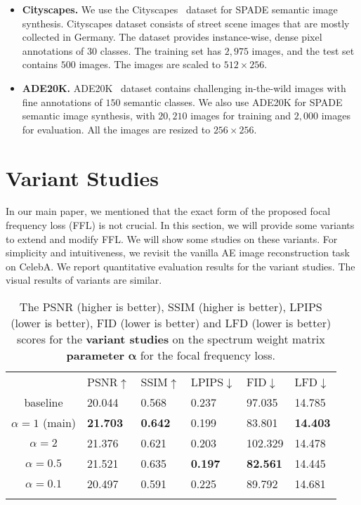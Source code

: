 \documentclass[10pt,twocolumn,letterpaper]{article}
\begin{document}
\begin{itemize}
	\item \textbf{Cityscapes.} We use the Cityscapes~\cite{cityscapes} dataset for SPADE semantic image synthesis. Cityscapes dataset consists of street scene images that are mostly collected in Germany. The dataset provides instance-wise, dense pixel annotations of $30$ classes. The training set has $2,975$ images, and the test set contains $500$ images. The images are scaled to $512 \times 256$.

	\item \textbf{ADE20K.} ADE20K~\cite{ade20k} dataset contains challenging in-the-wild images with fine annotations of $150$ semantic classes. We also use ADE20K for SPADE semantic image synthesis, with $20,210$ images for training and $2,000$ images for evaluation. All the images are resized to $256 \times 256$.
\end{itemize}



\section{Variant Studies}
\label{sec:variants}

In our main paper, we mentioned that the exact form of the proposed focal frequency loss (FFL) is not crucial. In this section, we will provide some variants to extend and modify FFL. We will show some studies on these variants.
For simplicity and intuitiveness, we revisit the vanilla AE image reconstruction task on CelebA.
We report quantitative evaluation results for the variant studies. The visual results of variants are similar.


\begin{table}[tb!]
\centering
\footnotesize
\caption{The PSNR (higher is better), SSIM (higher is better), LPIPS (lower is better), FID (lower is better) and LFD (lower is better) scores for the \textbf{variant studies} on the spectrum weight matrix \textbf{parameter} $\bm\alpha$ for the focal frequency loss.}
\begin{tabularx}{\linewidth}{c|*{5}{|Y}}
\Xhline{1pt}
 & PSNR$\uparrow$& SSIM$\uparrow$& LPIPS$\downarrow$& FID$\downarrow$& LFD$\downarrow$ \\
\Xhline{0.6pt}
baseline & 20.044& 0.568& 0.237& 97.035& 14.785 \\
\Xhline{0.4pt}
$\alpha=1$ (main) & {\bf21.703}& {\bf0.642}& 0.199& 83.801& {\bf14.403} \\
$\alpha=2$ & 21.376& 0.621& 0.203& 102.329& 14.478 \\
$\alpha=0.5$ & 21.521& 0.635& {\bf0.197}& {\bf82.561}& 14.445 \\
$\alpha=0.1$ & 20.497& 0.591& 0.225& 89.792& 14.681 \\
\Xhline{1pt}
\end{tabularx}
\label{tbl:variantsalpha}
\end{table}
\end{document}
